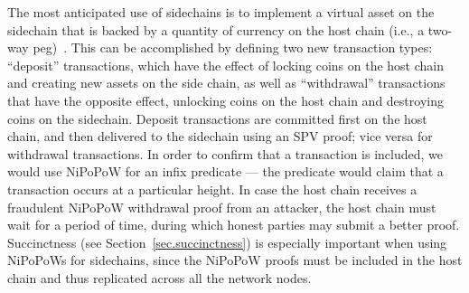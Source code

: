 The most anticipated use of sidechains is to implement a virtual asset on the sidechain that is backed by a quantity of currency on the host chain (i.e., a two-way peg)~\cite{sidechains}. This can be accomplished by defining two new transaction types: ``deposit'' transactions, which have the effect of locking coins on the host chain and creating new assets on the side chain, as well as ``withdrawal'' transactions that have the opposite effect, unlocking coins on the host chain and destroying coins on the sidechain. Deposit transactions are committed first on the host chain, and then delivered to the sidechain using an SPV proof; vice versa for withdrawal transactions. In order to confirm that a transaction is included, we would use NiPoPoW for an infix predicate --- the predicate would claim that a transaction occurs at a particular height. In case the host chain receives a fraudulent NiPoPoW withdrawal proof from an attacker, the host chain must wait for a period of time, during which honest parties may submit a better proof. Succinctness (see Section~\ref{sec.succinctness}) is especially important when using NiPoPoWs for sidechains, since the NiPoPoW proofs must be included in the host chain and thus replicated across all the network nodes.
